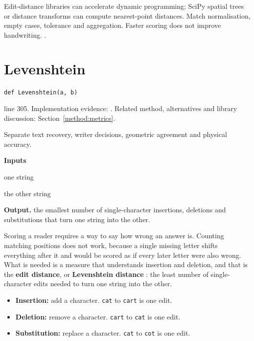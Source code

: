 Edit-distance libraries can accelerate dynamic programming; SciPy spatial trees or distance transforms can compute nearest-point distances. Match normalisation, empty cases, tolerance and aggregation. Faster scoring does not improve handwriting. \cite{levenshtein1966,tanksmetric,nistinterval}.


\section{Levenshtein}\label{fn:recognise:Levenshtein}
\begin{lstlisting}[style=sig]
def Levenshtein(a, b)
\end{lstlisting}
 line 305. Implementation evidence: \cite{code2026}. Related method, alternatives and library discussion: Section~\ref{method:metrics}.


Separate text recovery, writer decisions, geometric agreement and physical accuracy.




\noindent\textbf{Inputs}
\begin{description}[leftmargin=2.2em,style=nextline,font=\normalfont\ttfamily]\setlength\itemsep{1pt}
  \item[{a}] \normalfont one string
  \item[{b}] \normalfont the other string
\end{description}

\noindent\textbf{Output.} the smallest number of single-character insertions, deletions and substitutions that turn one string into the other.


Scoring a reader requires a way to say how wrong an answer is. Counting matching positions does not work, because a single missing letter shifts everything after it and would be scored as if every later letter were also wrong. What is needed is a measure that understands insertion and deletion, and that is the \textbf{edit distance}, or \textbf{Levenshtein distance} \cite{levenshtein1966}: the least number of single-character edits needed to turn one string into the other.


\begin{itemize}\setlength\itemsep{0pt}
  \item \textbf{Insertion:} add a character. \texttt{cat} to \texttt{cart} is one edit.
  \item \textbf{Deletion:} remove a character. \texttt{cart} to \texttt{cat} is one edit.
  \item \textbf{Substitution:} replace a character. \texttt{cat} to \texttt{cot} is one edit.
\end{itemize}

